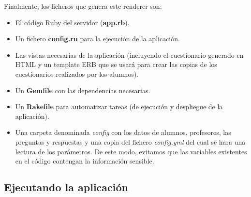 Finalmente, los ficheros que genera este renderer son:
\begin{itemize}
  \item El c\'odigo Ruby del servidor ({\bfseries app.rb}).
  \item Un fichero {\bfseries config.ru} para la ejecuci\'on de la aplicaci\'on.
  \item Las vistas necesarias de la aplicaci\'on (incluyendo el cuestionario generado en HTML y un template ERB que se usar\'a para crear las copias de los cuestionarios
  realizados por los alumnos).
  \item Un {\bfseries Gemfile} con las dependencias necesarias.
  \item Un {\bfseries Rakefile} para automatizar tareas (de ejecuci\'on y despliegue de la aplicaci\'on).
  \item Una carpeta denominada \textit{config} con los datos de alumnos, profesores, las preguntas y respuestas y una copia del fichero \textit{config.yml}
  del cual se hara una lectura de los par\'ametros. De este modo, evitamos que las variables existentes en el c\'odigo contengan la informaci\'on sensible.
\end{itemize}
\newpage

\subsection{Ejecutando la aplicaci\'on}
\label{subsec:Apendice2.16}

